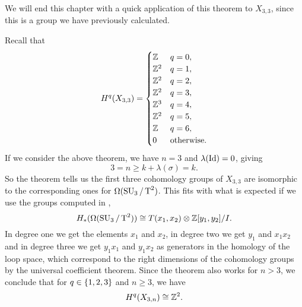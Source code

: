 We will end this chapter with a quick application of this theorem to
$X_{3,3}$, since this is a group we have previously calculated.

\begin{example}
  Recall that
  \[ H^q(X_{3,3}) = \begin{cases}
    \mathbb{Z} & q = 0, \\
    \mathbb{Z}^{2} & q=1, \\
    \mathbb{Z}^{2} & q=2, \\
    \mathbb{Z}^{2} & q=3, \\
    \mathbb{Z}^{3} & q=4, \\
    \mathbb{Z}^{2} & q=5, \\
    \mathbb{Z} & q=6, \\
    0 & \text{otherwise}.
  \end{cases} \]
  If we consider the above theorem, we have $n = 3$ and
  $\lambda(\operatorname{Id}) = 0$, giving
  \[ 3 = n \geq k +\lambda(\sigma) = k. \]
  So the theorem tells us the first three cohomology groups of
  $X_{3,3}$ are isomorphic to the corresponding ones for
  $\Omega(\operatorname{SU}_3/\operatorname{T}^2)$.
  This fits with what is expected if we use the groups computed in
  \cite{grbic},
  \[ H_*(\Omega(\operatorname{SU}_3/\operatorname{T}^2)) \cong T(x_1,x_{2}) \otimes
  \mathbb{Z}[y_1,y_{2}]/I. \]
  In degree one we get the elements $x_1$ and $x_2$, in degree two we
  get $y_1$ and $x_1 x_2$ and in degree three we get $y_1 x_1$ and
  $y_1 x_2$ as generators in the homology of the loop space, which
  correspond to the right dimensions of the cohomology groups by the
  universal coefficient theorem. Since the theorem also works for $n >
  3$, we conclude that for $q\in \left\{ 1,2,3 \right\}$ and $n\geq 3$, we have
  \[ H^q(X_{3,n}) \cong \mathbb{Z}^2. \]
\end{example}

